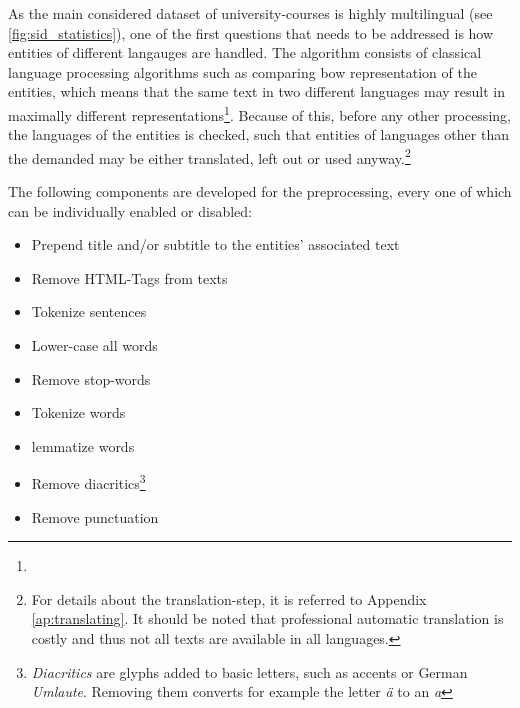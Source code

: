 As the main considered dataset of university-courses is highly multilingual (see \autoref{fig:sid_statistics}), one of the first questions that needs to be addressed is how entities of different langauges are handled. The algorithm consists of classical language processing algorithms such as comparing \gls{bow} representation of the entities, which means that the same text in two different languages may result in maximally different representations\footnote{}. Because of this, before any other processing, the languages of the entities is checked, such that entities of languages other than the demanded may be either translated, left out or used anyway.\footnote{For details about the translation-step, it is referred to Appendix \ref{ap:translating}. It should be noted that professional automatic translation is costly and thus not all texts are available in all languages.}


The following components are developed for the preprocessing, every one of which can be individually enabled or disabled:
\begin{itemize}
	\item Prepend title and/or subtitle to the entities' associated text 
	\item Remove HTML-Tags from texts 
	\item Tokenize sentences 
	\item Lower-case all words
	\item Remove stop-words
	\item Tokenize words
	\item \Gls{lemma}tize words
	\item Remove diacritics\footnote{\emph{Diacritics} are glyphs added to basic letters, such as accents or German \emph{Umlaute}. Removing them converts for example the letter \emph{ä} to an \emph{a}}
	\item Remove punctuation 
\end{itemize}


